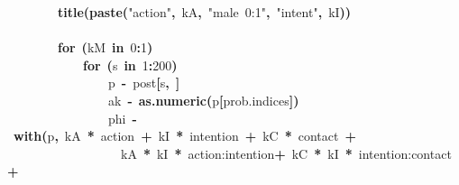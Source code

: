 \documentclass{article}
\makeatletter
\newcommand{\hlnumber}[1]{\textcolor[rgb]{0,0,0}{#1}}%
\newcommand{\hlfunctioncall}[1]{\textcolor[rgb]{.5,0,.33}{\textbf{#1}}}%
\newcommand{\hlstring}[1]{\textcolor[rgb]{.6,.6,1}{#1}}%
\newcommand{\hlkeyword}[1]{\textbf{#1}}%
\newcommand{\hlassignement}[1]{\textbf{#1}}%
\newcommand{\hlsymbol}[1]{#1}%
\newcommand{\hlstd}[1]{\textcolor[rgb]{0,0,0}{#1}}%
\newenvironment{kframe}{%
 \def\FrameCommand##1{\hskip\@totalleftmargin \hskip-\fboxsep
 \colorbox{shadecolor}{##1}\hskip-\fboxsep
     \hskip-\linewidth \hskip-\@totalleftmargin \hskip\columnwidth}%
 \MakeFramed {\advance\hsize-\width
   \@totalleftmargin\z@ \linewidth\hsize
   \@setminipage}}%
 {\par\unskip\endMakeFramed}
\newenvironment{knitrout}{}{} %
\makeatother
\begin{document}
\begin{knitrout}
{\begin{kframe}
\begin{flushleft}
\hlstd{}{\ }{\ }{\ }{\ }{\ }{\ }{\ }{\ }\hlfunctioncall{title}\hlkeyword{(}\hlfunctioncall{paste}\hlkeyword{(}\hlstring{"action"}\hlkeyword{,}{\ }\hlsymbol{kA}\hlkeyword{,}{\ }\hlstring{"male{\ }0:1"}\hlkeyword{,}{\ }\hlstring{"intent"}\hlkeyword{,}{\ }\hlsymbol{kI}\hlkeyword{)}\hlkeyword{)}\hspace*{\fill}\\
\hlstd{}\hspace*{\fill}\\
\hlstd{}{\ }{\ }{\ }{\ }{\ }{\ }{\ }{\ }\hlkeyword{for}{\ }\hlkeyword{(}\hlsymbol{kM}{\ }\hlkeyword{in}{\ }\hlnumber{0}\hlkeyword{:}\hlnumber{1}\hlkeyword{)}{\ }\hlkeyword{\usebox{\hlnormalsizeboxopenbrace}}\hspace*{\fill}\\
\hlstd{}{\ }{\ }{\ }{\ }{\ }{\ }{\ }{\ }{\ }{\ }{\ }{\ }\hlkeyword{for}{\ }\hlkeyword{(}\hlsymbol{s}{\ }\hlkeyword{in}{\ }\hlnumber{1}\hlkeyword{:}\hlnumber{200}\hlkeyword{)}{\ }\hlkeyword{\usebox{\hlnormalsizeboxopenbrace}}\hspace*{\fill}\\
\hlstd{}{\ }{\ }{\ }{\ }{\ }{\ }{\ }{\ }{\ }{\ }{\ }{\ }{\ }{\ }{\ }{\ }\hlsymbol{p}{\ }\hlassignement{\usebox{\hlnormalsizeboxlessthan}-}{\ }\hlsymbol{post}\hlkeyword{[}\hlsymbol{s}\hlkeyword{,}{\ }\hlkeyword{]}\hspace*{\fill}\\
\hlstd{}{\ }{\ }{\ }{\ }{\ }{\ }{\ }{\ }{\ }{\ }{\ }{\ }{\ }{\ }{\ }{\ }\hlsymbol{ak}{\ }\hlassignement{\usebox{\hlnormalsizeboxlessthan}-}{\ }\hlfunctioncall{as.numeric}\hlkeyword{(}\hlsymbol{p}\hlkeyword{[}\hlsymbol{prob.indices}\hlkeyword{]}\hlkeyword{)}\hspace*{\fill}\\
\hlstd{}{\ }{\ }{\ }{\ }{\ }{\ }{\ }{\ }{\ }{\ }{\ }{\ }{\ }{\ }{\ }{\ }\hlsymbol{phi}{\ }\hlassignement{\usebox{\hlnormalsizeboxlessthan}-}{\ }\hlfunctioncall{with}\hlkeyword{(}\hlsymbol{p}\hlkeyword{,}{\ }\hlsymbol{kA}{\ }\hlkeyword{*}{\ }\hlsymbol{action}{\ }\hlkeyword{+}{\ }\hlsymbol{kI}{\ }\hlkeyword{*}{\ }\hlsymbol{intention}{\ }\hlkeyword{+}{\ }\hlsymbol{kC}{\ }\hlkeyword{*}{\ }\hlsymbol{contact}{\ }\hlkeyword{+}\hspace*{\fill}\\
\hlstd{}{\ }{\ }{\ }{\ }{\ }{\ }{\ }{\ }{\ }{\ }{\ }{\ }{\ }{\ }{\ }{\ }{\ }{\ }\hlsymbol{kA}{\ }\hlkeyword{*}{\ }\hlsymbol{kI}{\ }\hlkeyword{*}{\ }\hlsymbol{\usebox{\hlnormalsizeboxbacktick}action:intention\usebox{\hlnormalsizeboxbacktick}}{\ }\hlkeyword{+}{\ }\hlsymbol{kC}{\ }\hlkeyword{*}{\ }\hlsymbol{kI}{\ }\hlkeyword{*}{\ }\hlsymbol{\usebox{\hlnormalsizeboxbacktick}intention:contact\usebox{\hlnormalsizeboxbacktick}}{\ }\hlkeyword{+}\hspace*{\fill}\\

\end{flushleft}
\end{kframe}}
\end{knitrout}
\end{document}
